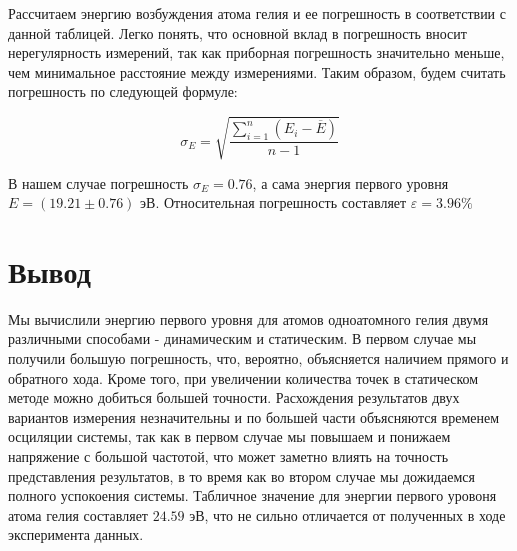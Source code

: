 \documentclass[12pt]{article}
\begin{document}
  Рассчитаем энергию возбуждения атома гелия и ее погрешность в соответствии с данной таблицей. Легко понять, что
  основной вклад в погрешность вносит нерегулярность измерений, так как приборная погрешность значительно меньше, чем
  минимальное расстояние между измерениями. Таким образом, будем считать погрешность по следующей формуле:

  $$
    \sigma_E = \sqrt{\frac{\sum\limits_{i = 1}^n \left(E_i - \overline{E}\right)}{n - 1}}
  $$

  В нашем случае погрешность $\sigma_E = 0.76$, а сама энергия первого уровня $E = (19.21 \pm 0.76)$ эВ.
  Относительная погрешность составляет $\varepsilon = 3.96 \%$

\section{Вывод}

  Мы вычислили энергию первого уровня для атомов одноатомного гелия двумя различными способами - динамическим и
  статическим. В первом случае мы получили большую погрешность, что, вероятно, объясняется наличием прямого и
  обратного хода. Кроме того, при увеличении количества точек в статическом методе можно добиться большей точности.
  Расхождения результатов двух вариантов измерения незначительны и по большей части объясняются временем осциляции
  системы, так как в первом случае мы повышаем и понижаем напряжение с большой частотой, что может заметно
  влиять на точность представления результатов, в то время как во втором случае мы дожидаемся полного успокоения
  системы. Табличное значение для энергии первого уровоня атома гелия составляет $24.59$ эВ, что не сильно
  отличается от полученных в ходе эксперимента данных.
\end{document}

